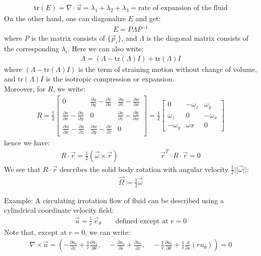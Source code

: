 \documentclass[11pt]{book}
\theoremstyle{break}
\theoremstyle{break}
\newcommand{\bmat}[1]{\begin{bmatrix} #1 \end{bmatrix}}
\newcommand{\example}{\color{green}Example: \color{black}}
\begin{document}
\begin{align*}
\text{tr}(E) = \nabla \cdot \vec{u} = \lambda_1+\lambda_2+\lambda_3 = \text{rate of expansion of the fluid}
\end{align*}
On the other hand, one can diagonalize $E$ and get:
\begin{align*}
E = P \Lambda P^{-1}
\end{align*}
where $P$ is the matrix consists of $\{\vec{p}_i\}$, and $\Lambda$ is the diagonal matrix consists of the corresponding $\lambda_i$. Here we can also write:
\begin{align*}
\Lambda = (\Lambda - \text{tr}(\Lambda) I ) + \text{tr}(\Lambda) I
\end{align*}
where $(\Lambda - \text{tr}(\Lambda) I )$ is the term of straining motion without change of volume, and $\text{tr}(\Lambda) I$ is the isotropic compression or expansion. \\

Moreover, for $R$, we write:
\begin{align*}
R = \frac{1}{2}\bmat{
0 & \frac{\partial u}{\partial y} - \frac{\partial v}{\partial x} & \frac{\partial u}{\partial z} - \frac{\partial w}{\partial x}\\
\frac{\partial v}{\partial x} - \frac{\partial u}{\partial y} & 0 & \frac{\partial v}{\partial z} - \frac{\partial y}{\partial w}\\
\frac{\partial w}{\partial x} - \frac{\partial u}{\partial z} & \frac{\partial w}{\partial y} - \frac{\partial v}{\partial z} & 0
} = \frac{1}{2}\bmat{0 & -\omega_z & \omega_y \\ \omega_z &0 & -\omega_x \\ -\omega_y & \omega x & 0}
\end{align*}
hence we have:
\begin{align*}
R\cdot \vec{r} = \frac{1}{2}(\vec{\omega}\times \vec{r})\qquad \qquad \qquad \vec{r}^T \cdot R\cdot \vec{r} = 0
\end{align*}
We see that $R\cdot \vec{r}$ describes the solid body rotation with angular velocity $\frac{1}{2}||\vec{\omega}||$:
\begin{align*}
\vec{\Omega} \coloneqq \frac{1}{2}\vec{\omega}
\end{align*} 

\hfill\break
\hfill\break
\example A circulating irrotation flow of fluid can be described using a cylindrical coordinate velocity field: 
\begin{align*}
\vec{u} = \frac{1}{r}\,\vec{e}_{\theta} \qquad\text{defined except at }r=0
\end{align*}
Note that, except at $r = 0$, we can write:
\begin{align*}
\nabla \times \vec{u} = \left( - \frac{\partial u_{\theta}}{\partial z} + \frac{1}{r}\frac{\partial u_z}{\partial \theta}, \quad -\frac{\partial u_z}{\partial r} + \frac{\partial u_r}{\partial z} , \quad -\frac{1}{r}\frac{\partial u_r}{\partial \theta}+ \frac{1}{r}\frac{\partial}{\partial r}(ru_\theta)\right) = 0
\end{align*}
\end{document}
